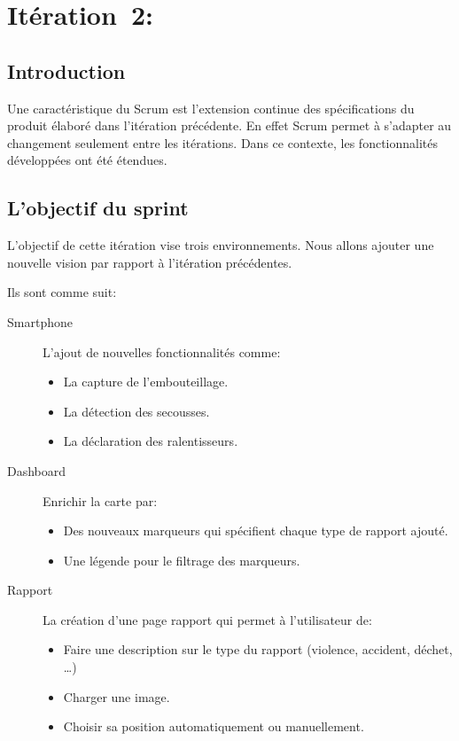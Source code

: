 \section[Itération~2:~(~3/8/2017~-~3/28/2017~)]{Itération~2:~\textup{}}

\subsection{Introduction}

Une caractéristique du Scrum est l'extension continue des spécifications du produit élaboré
dans l'itération précédente.
En effet Scrum permet à s'adapter au changement seulement entre les itérations.
Dans ce contexte, les fonctionnalités développées ont été étendues.

\subsection{L'objectif du sprint}

L'objectif de cette itération vise trois environnements. Nous allons ajouter
une nouvelle vision par rapport à l'itération précédentes.

Ils sont comme suit:

\begin{description}
    \item [Smartphone] L'ajout de nouvelles fonctionnalités comme:
        \begin{itemize}
            \item La capture de l'embouteillage.
            \item La détection des secousses.
            \item La déclaration des ralentisseurs.
        \end{itemize}
    \item [Dashboard] Enrichir la carte par:
        \begin{itemize}
            \item Des nouveaux marqueurs qui spécifient chaque type de rapport
                ajouté.
            \item Une légende pour le filtrage des marqueurs.
        \end{itemize}
    \item [Rapport] La création d'une page rapport qui permet à l'utilisateur
        de:
        \begin{itemize}
            \item Faire une description sur le type du rapport (violence,
                accident, déchet, \ldots)
            \item Charger une image.
            \item Choisir sa position automatiquement ou manuellement.
        \end{itemize}
\end{description}

